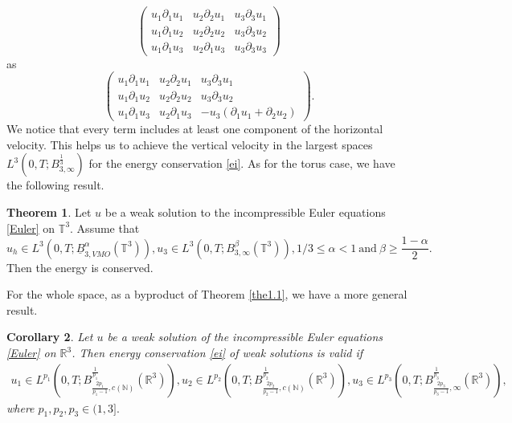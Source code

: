 \documentclass[11pt]{article}
\theoremstyle{plain}\newtheorem{definition}{Definition}[section]
\theoremstyle{definition}\newtheorem{theorem}{Theorem}[section]
\theoremstyle{plain}\newtheorem{lemma}[theorem]{Lemma}
\theoremstyle{plain}\newtheorem{coro}[theorem]{Corollary}
\theoremstyle{plain}\newtheorem{prop}[theorem]{Proposition}
\theoremstyle{remark}\newtheorem{remark}{Remark}[section]
\newcommand{\ba}{\begin{aligned}}
\newcommand{\ea}{\end{aligned}}
\newcommand{\f}{\frac}
\numberwithin{equation}{section}
\begin{document}
\begin{displaymath}
\left( \begin{array}{ccc}
u_{1}\partial_{1}u_{1} & u_{2}\partial_{2}u_{1} & u_{3}\partial_{3}u_{1} \\
u_{1}\partial_{1}u_{2} & u_{2}\partial_{2}u_{2} & u_{3}\partial_{3}u_{2} \\
u_{1}\partial_{1}u_{3} & u_{2}\partial_{1}u_{3} & u_{3}\partial_{3}u_{3}
\end{array} \right)
\end{displaymath}
as
\begin{displaymath}
\left( \begin{array}{ccc}
u_{1}\partial_{1}u_{1} & u_{2}\partial_{2}u_{1} & u_{3}\partial_{3}u_{1} \\
u_{1}\partial_{1}u_{2} & u_{2}\partial_{2}u_{2} & u_{3}\partial_{3}u_{2} \\
u_{1}\partial_{1}u_{3} & u_{2}\partial_{1}u_{3} & -u_{3}(\partial_{1}u_{1}+\partial_{2}u_{2})
\end{array} \right).
\end{displaymath}
We notice that every term includes at least one component of the horizontal velocity. This helps us to achieve the vertical velocity in the largest spaces $ L^{3} (0,T; B^{\f13}_{3,\infty})$ for the energy conservation \eqref{ei}.
As for the torus case, we have the following result.
\begin{theorem}\label{the1.2} Let $u$ be a weak solution to  the incompressible   Euler equations \eqref{Euler} on $\mathbb{T}^{3}$.
Assume that $$u_{h}\in L^{3} (0,T;\underline{B}^{\alpha }_{3,VMO}
 (\mathbb{T}^3) ), u_{3}\in L^{3} (0,T;B^{\beta}_{3,\infty}
   (\mathbb{T}^3)),  1/3\leq \alpha <1\ \text{and}\ \beta\geq \frac{1-\alpha}{2}. $$
Then the energy is   conserved.
\end{theorem}
For the whole space, as a byproduct of Theorem \ref{the1.1}, we have a more general result.
 \begin{coro}\label{coro1.3} Let $u$ be a weak solution of the incompressible   Euler equations \eqref{Euler} on   $\mathbb{R}^{3}$.  Then energy conservation  \eqref{ei} of weak solutions  is valid  if
$$\ba
 u_1 \in L^{p_{1}}(0,T;B^{\f{1}{p_{1 }}}_{\f{{2}{p_{1}}}{p_{1}-1},c(\mathbb{N})}(\mathbb{R}^{3})),
 u_2 \in L^{p_{2}}(0,T;B^{\f{1}{p_{2}}}_{\f{2p_{2}}{p_{2}-1},c(\mathbb{N})}(\mathbb{R}^{3})),  u_3 \in L^{p_{3}}(0,T;B^{\f{1}{p_{3}}}_{\f{{2}{p_{3}}}{p_{3}-1},\infty}(\mathbb{R}^{3})),  \ea$$
 where $p_{1},  p_{2},  p_{3} \in(1,3].$
 \end{coro}
\end{document}
